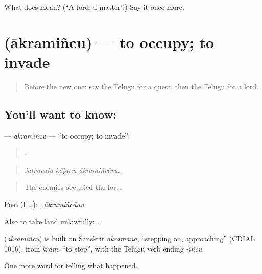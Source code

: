 \begin{tcolorbox}[breakable,colback=teal!4,colframe=teal!35!black,title={Before you move on}]
What does  mean? (\textquotedblleft{}A lord; a master\textquotedblright{}.) Say it once more.
\end{tcolorbox}
\section[\texorpdfstring{\te{ఆక్రమించు} (ākramiñcu)}{ఆక్రమించు (ākramiñcu)}]{ (ākramiñcu) — to occupy; to invade}

\label{lesson:TE-C366-akramincu}



\begin{quote}
Before the new one: say the Telugu for a quest, then the Telugu for a lord.
\end{quote}

\subsection*{You'll want to know: }
\textbf{} — \emph{ākramiñcu} — \textquotedblleft{}to occupy; to invade\textquotedblright{}.

\begin{quote}
  .
\end{quote}

\begin{quote}
\emph{śatruvulu kōṭanu ākramiñcāru.}
\end{quote}

\begin{quote}
The enemies occupied the fort.
\end{quote}

Past (I …): , \emph{ākramiñcānu}.

Also to take land unlawfully:  .

\begin{cousinweb}
\textbf{} (\emph{ākramiñcu}) is built on Sanskrit \emph{ākramaṇa}, \textquotedblleft{}stepping on, approaching\textquotedblright{} (CDIAL 1016), from \emph{kram}, \textquotedblleft{}to step\textquotedblright{}, with the Telugu verb ending \emph{-iñcu}.
\end{cousinweb}

\begin{grammarlens}[title={What you've built}]
One more word for telling what happened.
\end{grammarlens}

